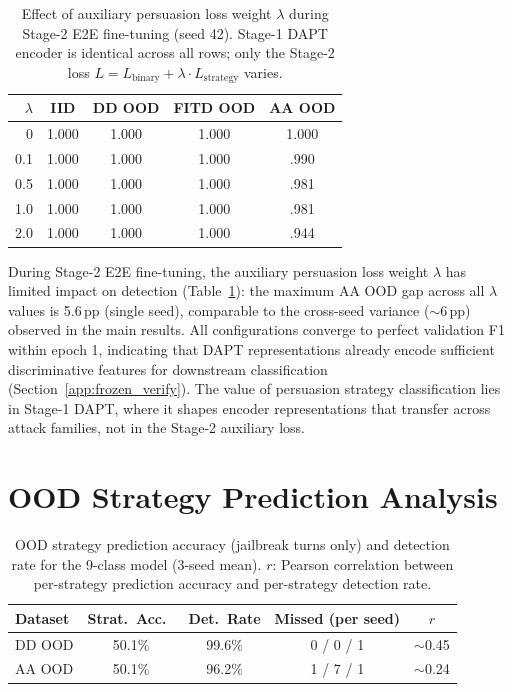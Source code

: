 \begin{table}[ht]
\centering
\footnotesize
\caption{Effect of auxiliary persuasion loss weight $\lambda$ during Stage-2 E2E fine-tuning (seed 42). Stage-1 DAPT encoder is identical across all rows; only the Stage-2 loss $L = L_{\text{binary}} + \lambda \cdot L_{\text{strategy}}$ varies.}
\label{tab:lambda}
\begin{tabular}{@{}rcccc@{}}
\toprule
$\lambda$ & IID & DD OOD & FITD OOD & AA OOD \\
\midrule
0 & 1.000 & 1.000 & 1.000 & 1.000 \\
0.1 & 1.000 & 1.000 & 1.000 & .990 \\
0.5 & 1.000 & 1.000 & 1.000 & .981 \\
1.0 & 1.000 & 1.000 & 1.000 & .981 \\
2.0 & 1.000 & 1.000 & 1.000 & .944 \\
\bottomrule
\end{tabular}
\end{table}

During Stage-2 E2E fine-tuning, the auxiliary persuasion loss weight $\lambda$ has limited impact on detection (Table~\ref{tab:lambda}): the maximum AA OOD gap across all $\lambda$ values is 5.6\,pp (single seed), comparable to the cross-seed variance ($\sim$6\,pp) observed in the main results. All configurations converge to perfect validation F1 within epoch 1, indicating that DAPT representations already encode sufficient discriminative features for downstream classification (Section~\ref{app:frozen_verify}). The value of persuasion strategy classification lies in Stage-1 DAPT, where it shapes encoder representations that transfer across attack families, not in the Stage-2 auxiliary loss.

\section{OOD Strategy Prediction Analysis}
\label{app:strategy_pred}

\begin{table}[ht]
\centering
\footnotesize
\caption{OOD strategy prediction accuracy (jailbreak turns only) and detection rate for the 9-class model (3-seed mean). $r$: Pearson correlation between per-strategy prediction accuracy and per-strategy detection rate.}
\label{tab:strategy_pred}
\begin{tabular}{@{}lcccc@{}}
\toprule
\textbf{Dataset} & Strat.\ Acc.\ & Det.\ Rate & Missed (per seed) & $r$ \\
\midrule
DD OOD & 50.1\% & 99.6\% & 0 / 0 / 1 & $\sim$0.45 \\
AA OOD & 50.1\% & 96.2\% & 1 / 7 / 1 & $\sim$0.24 \\
\bottomrule
\end{tabular}
\end{table}


